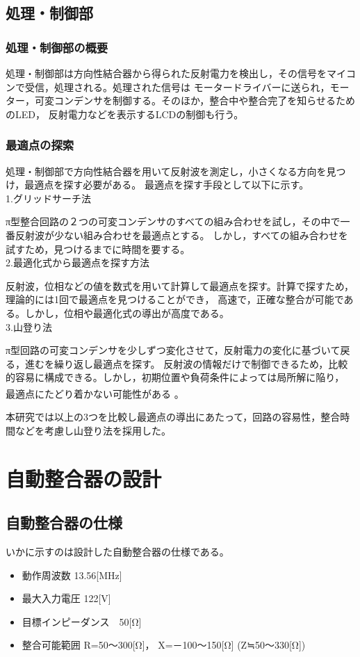 \documentclass[uplatex, 12pt,oneside,openany]{ujbook}
\begin{document}
\section{処理・制御部}
 \subsection{処理・制御部の概要}
処理・制御部は方向性結合器から得られた反射電力を検出し，その信号をマイコンで受信，処理される。処理された信号は
モータードライバーに送られ，モーター，可変コンデンサを制御する。そのほか，整合中や整合完了を知らせるためのLED，
反射電力などを表示するLCDの制御も行う。
 \subsection{最適点の探索}
処理・制御部で方向性結合器を用いて反射波を測定し，小さくなる方向を見つけ，最適点を探す必要がある。
最適点を探す手段として以下に示す。\\

1.グリッドサーチ法

π型整合回路の２つの可変コンデンサのすべての組み合わせを試し，その中で一番反射波が少ない組み合わせを最適点とする。
しかし，すべての組み合わせを試すため，見つけるまでに時間を要する。\\

2.最適化式から最適点を探す方法

反射波，位相などの値を数式を用いて計算して最適点を探す。計算で探すため，理論的には1回で最適点を見つけることができ，
高速で，正確な整合が可能である。しかし，位相や最適化式の導出が高度である。\\

3.山登り法

π型回路の可変コンデンサを少しずつ変化させて，反射電力の変化に基づいて戻る，進むを繰り返し最適点を探す。
反射波の情報だけで制御できるため，比較的容易に構成できる。しかし，初期位置や負荷条件によっては局所解に陥り，
最適点にたどり着かない可能性がある
\textsuperscript{\cite{ichikawa}}。

本研究では以上の3つを比較し最適点の導出にあたって，回路の容易性，整合時間などを考慮し山登り法を採用した。
\chapter{自動整合器の設計}

\section{自動整合器の仕様}
 いかに示すのは設計した自動整合器の仕様である。\\
 \begin{itemize}
    \item 動作周波数         13.56[MHz]
    \item 最大入力電圧       122[V]
    \item 目標インピーダンス　50[Ω]
    \item 整合可能範囲       R=50～300[Ω]， X=－100～150[Ω] (Z≒50～330[Ω])
\end{itemize}
\end{document}
